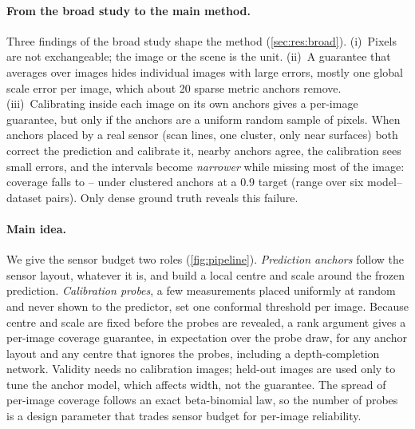 \paragraph{From the broad study to the main method.}
Three findings of the broad study shape the method (\cref{sec:res:broad}).
(i)~Pixels are not exchangeable; the image or the scene is the unit.
(ii)~A guarantee that averages over images hides individual images with large errors, mostly one global scale error per image, which about 20 sparse metric anchors remove.
(iii)~Calibrating inside each image on its own anchors gives a per-image guarantee, but only if the anchors are a uniform random sample of pixels.
When anchors placed by a real sensor (scan lines, one cluster, only near surfaces) both correct the prediction and calibrate it, nearby anchors agree, the calibration sees small errors, and the intervals become \emph{narrower} while missing most of the image: coverage falls to \NumLocalClusterCovLo--\NumLocalClusterCovHi{} under clustered anchors at a 0.9 target (range over six model--dataset pairs).
Only dense ground truth reveals this failure.

\paragraph{Main idea.}
We give the sensor budget two roles (\cref{fig:pipeline}).
\emph{Prediction anchors} follow the sensor layout, whatever it is, and build a local centre and scale around the frozen prediction.
\emph{Calibration probes}, a few measurements placed uniformly at random and never shown to the predictor, set one conformal threshold per image.
Because centre and scale are fixed before the probes are revealed, a rank argument gives a per-image coverage guarantee, in expectation over the probe draw, for any anchor layout and any centre that ignores the probes, including a depth-completion network.
Validity needs no calibration images; held-out images are used only to tune the anchor model, which affects width, not the guarantee.
The spread of per-image coverage follows an exact beta-binomial law, so the number of probes is a design parameter that trades sensor budget for per-image reliability.

